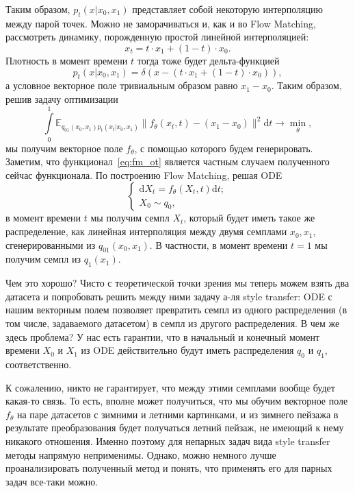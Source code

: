 \documentclass[12pt]{article}
\theoremstyle{definition}
\begin{document}
Таким образом, $p_t(x | x_0, x_1)$ представляет собой некоторую интерполяцию между парой точек. Можно не заморачиваться и, как и во Flow Matching, рассмотреть динамику, порожденную простой линейной интерполяцией:
\[
    x_t = t \cdot x_1 + (1 - t) \cdot x_0.
\]
Плотность в момент времени $t$ тогда тоже будет дельта-функцией
\[
    p_t(x | x_0, x_1) = \delta\left(x - \left(t \cdot x_1 + (1 - t) \cdot x_0\right)\right),
\]
а условное векторное поле тривиальным образом равно $x_1 - x_0$. Таким образом, решив задачу оптимизации
\begin{equation}
    \label{eq:cfm_ot}
    \int\limits_{0}^{1}\mathbb{E}_{q_{01}(x_0, x_1)p_t(x_t | x_0, x_1)} \|f_\theta(x_t, t) - (x_1 - x_0) \|^2 \mathrm{d} t \rightarrow \min\limits_{\theta},
\end{equation}
мы получим векторное поле $f_\theta$, с помощью которого будем генерировать. Заметим, что функционал~\ref{eq:fm_ot} является частным случаем полученного сейчас функционала. По построению Flow Matching, решая ODE
\[
    \begin{cases}
        \mathrm{d} X_t = f_\theta(X_t, t) \mathrm{d} t;\\
        X_0 \sim q_0,
    \end{cases}
\]
в момент времени $t$ мы получим семпл $X_t$, который будет иметь такое же распределение, как линейная интерполяция между двумя семплами $x_0, x_1$, сгенерированными из $q_{01}(x_0, x_1)$. В частности, в момент времени $t = 1$ мы получим семпл из $q_1(x_1)$.

Чем это хорошо? Чисто с теоретической точки зрения мы теперь можем взять два датасета и попробовать решить между ними задачу а-ля style transfer: ODE с нашим векторным полем позволяет превратить семпл из одного распределения (в том числе, задаваемого датасетом) в семпл из другого распределения. В чем же здесь проблема? У нас есть гарантии, что в начальный и конечный момент времени $X_0$ и $X_1$ из ODE действительно будут иметь распределения $q_0$ и $q_1$, соответственно.

К сожалению, никто не гарантирует, что между этими семплами вообще будет какая-то связь. То есть, вполне может получиться, что мы обучим векторное поле $f_\theta$ на паре датасетов с зимними и летними картинками, и из зимнего пейзажа в результате преобразования будет получаться летний пейзаж, не имеющий к нему никакого отношения. Именно поэтому для непарных задач вида style transfer методы напрямую неприменимы. Однако, можно немного лучше проанализировать полученный метод и понять, что применять его для парных задач все-таки можно.
\end{document}
